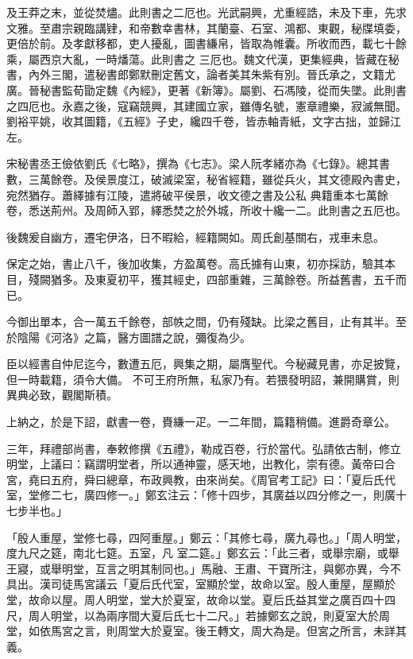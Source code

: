 \begin{pinyinscope}
 及王莽之末，並從焚燼。此則書之二厄也。光武嗣興，尤重經誥，未及下車，先求文雅。至肅宗親臨講肄，和帝數幸書林，其蘭臺、石室、鴻都、東觀，秘牒填委，更倍於前。及孝獻移都，吏人擾亂，圖書縑帛，皆取為帷囊。所收而西，載七十餘乘，屬西京大亂，一時燔蕩。此則書之
 三厄也。魏文代漢，更集經典，皆藏在秘書，內外三閣，遣秘書郎鄭默刪定舊文，論者美其朱紫有別。晉氏承之，文籍尤廣。晉秘書監荀勖定魏《內經》，更著《新簿》。屬劉、石馮陵，從而失墜。此則書之四厄也。永嘉之後，寇竊競興，其建國立家，雖傳名號，憲章禮樂，寂滅無聞。劉裕平姚，收其圖籍，《五經》子史，纔四千卷，皆赤軸青紙，文字古拙，並歸江左。



 宋秘書丞王儉依劉氏《七略》，撰為《七志》。梁人阮孝緒亦為《七錄》。總其書數，三萬餘卷。及侯景度江，破滅梁室，秘省經籍，雖從兵火，其文德殿內書史，宛然猶存。蕭繹據有江陵，遣將破平侯景，收文德之書及公私
 典籍重本七萬餘卷，悉送荊州。及周師入郢，繹悉焚之於外城，所收十纔一二。此則書之五厄也。



 後魏爰自幽方，遷宅伊洛，日不暇給，經籍闕如。周氏創基關右，戎車未息。



 保定之始，書止八千，後加收集，方盈萬卷。高氏據有山東，初亦採訪，驗其本目，殘闕猶多。及東夏初平，獲其經史，四部重雜，三萬餘卷。所益舊書，五千而已。



 今御出單本，合一萬五千餘卷，部帙之間，仍有殘缺。比梁之舊目，止有其半。至於陰陽《河洛》之篇，醫方圖譜之說，彌復為少。



 臣以經書自仲尼迄今，數遭五厄，興集之期，屬膺聖代。今秘藏見書，亦足披覽，但一時載籍，須令大備。
 不可王府所無，私家乃有。若猥發明詔，兼開購賞，則異典必致，觀閣斯積。



 上納之，於是下詔，獻書一卷，賚縑一疋。一二年間，篇籍稍備。進爵奇章公。



 三年，拜禮部尚書，奉敕修撰《五禮》，勒成百卷，行於當代。弘請依古制，修立明堂，上議曰：竊謂明堂者，所以通神靈，感天地，出教化，崇有德。黃帝曰合宮，堯曰五府，舜曰總章，布政興教，由來尚矣。《周官考工記》曰：「夏后氏代室，堂修二七，廣四修一。」鄭玄注云：「修十四步，其廣益以四分修之一，則廣十七步半也。」



 「殷人重屋，堂修七尋，四阿重屋。」鄭云：「其修七尋，廣九尋也。」「周人明堂，度九尺之筵，南北七筵。五室，凡
 室二筵。」鄭玄云：「此三者，或舉宗廟，或舉王寢，或舉明堂，互言之明其制同也。」馬融、王肅、干寶所注，與鄭亦異，今不具出。漢司徒馬宮議云「夏后氏代室，室顯於堂，故命以室。殷人重屋，屋顯於堂，故命以屋。周人明堂，堂大於夏室，故命以堂。夏后氏益其堂之廣百四十四尺，周人明堂，以為兩序間大夏后氏七十二尺。」若據鄭玄之說，則夏室大於周堂，如依馬宮之言，則周堂大於夏室。後王轉文，周大為是。但宮之所言，未詳其義。




\end{pinyinscope}
